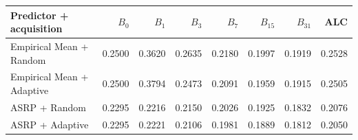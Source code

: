 \begin{tabular}{lrrrrrrr}
\toprule
Predictor + acquisition & $B_0$ & $B_1$ & $B_3$ & $B_7$ & $B_{15}$ & $B_{31}$ & ALC\\
\midrule
Empirical Mean + Random & 0.2500 & 0.3620 & 0.2635 & 0.2180 & 0.1997 & 0.1919 & 0.2528\\
Empirical Mean + Adaptive & 0.2500 & 0.3794 & 0.2473 & 0.2091 & 0.1959 & 0.1915 & 0.2505\\
ASRP + Random & 0.2295 & 0.2216 & 0.2150 & 0.2026 & 0.1925 & 0.1832 & 0.2076\\
ASRP + Adaptive & 0.2295 & 0.2221 & 0.2106 & 0.1981 & 0.1889 & 0.1812 & 0.2050\\
\bottomrule
\end{tabular}
